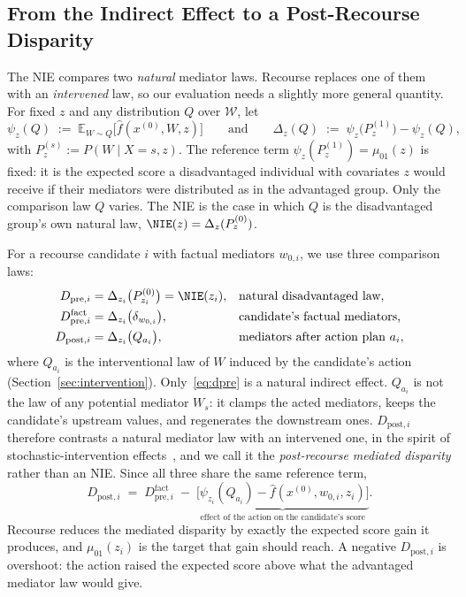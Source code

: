 \subsection{From the Indirect Effect to a Post-Recourse Disparity}
\label{sec:mediated_contrast}

The NIE compares two \emph{natural} mediator laws. Recourse replaces one of
them with an \emph{intervened} law, so our evaluation needs a slightly more
general quantity. For fixed $z$ and any distribution $Q$ over $\mathcal W$, let
\begin{equation}
  \psi_z(Q)\;:=\;\mathbb E_{W\sim Q}\bigl[\hat f(x^{(0)},W,z)\bigr]
  \qquad\text{and}\qquad
  \Delta_z(Q)\;:=\;\psi_z\bigl(P_z^{(1)}\bigr)-\psi_z(Q),
  \label{eq:delta}
\end{equation}
with $P_z^{(s)}:=P(W\mid X=s,z)$. The reference term
$\psi_z(P_z^{(1)})=\mu_{01}(z)$ is fixed: it is the expected score a
disadvantaged individual with covariates $z$ would receive if their mediators
were distributed as in the advantaged group. Only the comparison law $Q$
varies. The NIE is the case in which $Q$ is the disadvantaged group's own
natural law, $\NIE(z)=\Delta_z(P_z^{(0)})$.

For a recourse candidate $i$ with factual mediators $w_{0,i}$, we use three
comparison laws:
\begin{align}
  D_{\mathrm{pre},i}&=\Delta_{z_i}\bigl(P_{z_i}^{(0)}\bigr)=\NIE(z_i),
  &&\text{natural disadvantaged law,}\label{eq:dpre}\\
  D^{\mathrm{fact}}_{\mathrm{pre},i}&=\Delta_{z_i}\bigl(\delta_{w_{0,i}}\bigr),
  &&\text{candidate's factual mediators,}\label{eq:dpre_fact}\\
  D_{\mathrm{post},i}&=\Delta_{z_i}\bigl(Q_{a_i}\bigr),
  &&\text{mediators after action plan } a_i,\label{eq:dpost}
\end{align}
where $Q_{a_i}$ is the interventional law of $W$ induced by the candidate's
action (Section~\ref{sec:intervention}). Only~\eqref{eq:dpre} is a natural
indirect effect. $Q_{a_i}$ is not the law of any potential mediator $W_s$: it
clamps the acted mediators, keeps the candidate's upstream values, and
regenerates the downstream ones. $D_{\mathrm{post},i}$ therefore contrasts a
natural mediator law with an intervened one, in the spirit of
stochastic-intervention effects~\citep{diaz2012population}, and we call it the
\emph{post-recourse mediated disparity} rather than an NIE. Since all three
share the same reference term,
\begin{equation}
  D_{\mathrm{post},i}
  \;=\;D^{\mathrm{fact}}_{\mathrm{pre},i}
  \;-\;\underbrace{\bigl[\psi_{z_i}(Q_{a_i})-\hat f(x^{(0)},w_{0,i},z_i)\bigr]}_{
     \text{effect of the action on the candidate's score}}.
  \label{eq:dpost_decomp}
\end{equation}
Recourse reduces the mediated disparity by exactly the expected score gain it
produces, and $\mu_{01}(z_i)$ is the target that gain should reach. A negative
$D_{\mathrm{post},i}$ is overshoot: the action raised the expected score above
what the advantaged mediator law would give.

